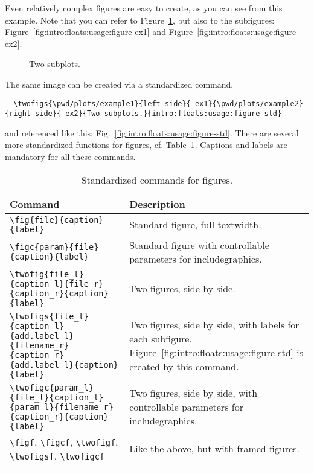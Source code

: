 


Even relatively complex figures are easy to create, as you can see from this example. Note that you can refer to Figure~\ref{fig:intro:floats:usage:figure}, but also to the subfigures: Figure~\ref{fig:intro:floats:usage:figure-ex1} and Figure~\ref{fig:intro:floats:usage:figure-ex2}.
\begin{figure}
  \centering
   \hfill
  \caption{Two subplots.}
  \label{fig:intro:floats:usage:figure}
\end{figure}

\noindent The same image can be created via a standardized command,
{\tiny\begin{verbatim}
  \twofigs{\pwd/plots/example1}{left side}{-ex1}{\pwd/plots/example2}{right side}{-ex2}{Two subplots.}{intro:floats:usage:figure-std}
\end{verbatim}}
\noindent and referenced like this: Fig.~\ref{fig:intro:floats:usage:figure-std}. There are several more standardized functions for figures, cf. Table~\ref{tab:intro:floats:figures}. Captions and labels are mandatory for all these commands.
\begin{longtable}{>{\tiny}l|>{\tiny}p{}}
  \normalsize\textbf{Command} & \normalsize\textbf{Description} \\\hline
  \verb|\fig{file}{caption}{label}| & Standard figure, full textwidth. \\\hline
  \verb|\figc{param}{file}{caption}{label}| & Standard figure with controllable parameters for includegraphics. \\\hline
  \verb|\twofig{file_l}{caption_l}{file_r}{caption_r}{caption}{label}| & Two figures, side by side. \\\hline
  \verb|\twofigs{file_l}{caption_l}{add.label_l}{filename_r}{caption_r}{add.label_l}{caption}{label}| & Two figures, side by side, with labels for each subfigure. Figure~\ref{fig:intro:floats:usage:figure-std} is created by this command.\\\hline
  \verb|\twofigc{param_l}{file_l}{caption_l}{param_l}{filename_r}{caption_r}{caption}{label}| & Two figures, side by side, with controllable parameters for includegraphics. \\\hline
  \verb|\figf|, \verb|\figcf|, \verb|\twofigf|, \verb|\twofigsf|, \verb|\twofigcf| & Like the above, but with framed figures. \\
  \caption{Standardized commands for figures.}
  \label{tab:intro:floats:figures}
\end{longtable}

